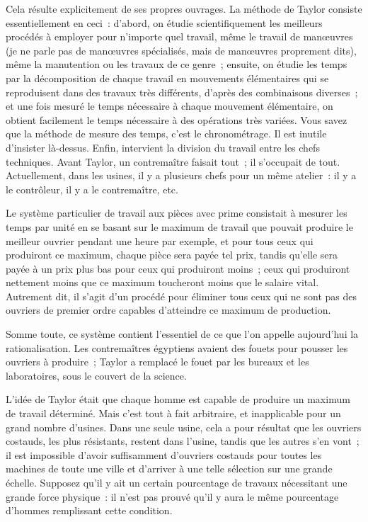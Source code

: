 \documentclass[french,twoside]{book} %
\begin{document}
Cela résulte explicitement de ses propres ouvrages. La méthode de Taylor consiste essentiellement en ceci : d'abord, on étudie scientifiquement les meilleurs procédés à employer pour n'importe quel travail, même le travail de manœuvres (je ne parle pas de manœuvres spécialisés, mais de manœuvres proprement dits), même la manutention ou les travaux de ce genre ; ensuite, on étudie les temps par la décomposition de chaque travail en mouvements élémentaires qui se reproduisent dans des travaux très différents, d'après des combinaisons diverses ; et une fois mesuré le temps nécessaire à chaque mouvement élémentaire, on obtient facilement le temps nécessaire à des opérations très variées. Vous savez que la méthode de mesure des temps, c'est le chronométrage. Il est inutile d'insister là-dessus. Enfin, intervient la division du travail entre les chefs techniques. Avant Taylor, un contremaître faisait tout ; il s'occupait de tout. Actuellement, dans les usines, il y a plusieurs chefs pour un même atelier : il y a le contrôleur, il y a le contremaître, etc.\par
Le système particulier de travail aux pièces avec prime consistait à mesurer les temps par unité en se basant sur le maximum de travail que pouvait produire le meilleur ouvrier pendant une heure par exemple, et pour tous ceux qui produiront ce maximum, chaque pièce sera payée tel prix, tandis qu'elle sera payée à un prix plus bas pour ceux qui produiront moins ; ceux qui produiront nettement moins que ce maximum toucheront moins que le salaire vital. Autrement dit, il s'agit d'un procédé pour éliminer tous ceux qui ne sont pas des ouvriers de premier ordre capables d'atteindre ce maximum de production.\par
Somme toute, ce système contient l'essentiel de ce que l'on appelle aujourd'hui la rationalisation. Les contremaîtres égyptiens avaient des fouets pour pousser les ouvriers à produire ; Taylor a remplacé le fouet par les bureaux et les laboratoires, sous le couvert de la science.\par
L'idée de Taylor était que chaque homme est capable de produire un maximum de travail déterminé. Mais c'est tout à fait arbitraire, et inapplicable pour un grand nombre d'usines. Dans une seule usine, cela a pour résultat que les ouvriers costauds, les plus résistants, restent dans l'usine, tandis que les autres s'en vont ; il est impossible d'avoir suffisamment d'ouvriers costauds pour toutes les machines de toute une ville et d'arriver à une telle sélection sur une grande échelle. Supposez qu'il y ait un certain pourcentage de travaux nécessitant une grande force physique : il n'est pas prouvé qu'il y aura le même pourcentage d'hommes remplissant cette condition.\par
\end{document}
